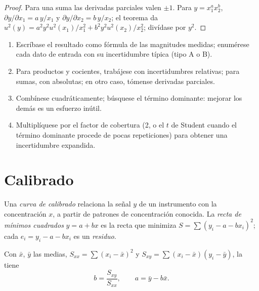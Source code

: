 \begin{proof}
Para una suma las derivadas parciales valen $\pm1$. Para $y = x_1^ax_2^b$, $\partial y/\partial x_1 =
a\,y/x_1$ y $\partial y/\partial x_2 = b\,y/x_2$; el teorema da $u^2(y) = a^2y^2u^2(x_1)/x_1^2 +
b^2y^2u^2(x_2)/x_2^2$; divídase por $y^2$.
\end{proof}

\begin{method}[Propagar]\label{met:b2:measurement-statistics:propagate}
\begin{enumerate}
  \item Escríbase el resultado como fórmula de las magnitudes medidas; enumérese cada dato de entrada con su incertidumbre
        típica (tipo A o B).
  \item Para productos y cocientes, trabájese con incertidumbres relativas; para sumas, con absolutas;
        en otro caso, tómense derivadas parciales.
  \item Combínese cuadráticamente; búsquese el término dominante: mejorar los demás es un esfuerzo inútil.
  \item Multiplíquese por el factor de cobertura (2, o el $t$ de Student cuando el término dominante procede de pocas
        repeticiones) para obtener una incertidumbre expandida.
\end{enumerate}
\end{method}

\section{Calibrado}

\begin{definition}\label{def:b2:measurement-statistics:calibration}
Una \emph{curva de calibrado} relaciona la señal $y$ de un instrumento con la
concentración $x$, a partir de patrones de concentración conocida. La \emph{recta de mínimos
cuadrados} $y = a + bx$ es la recta que minimiza $S = \sum (y_i - a -
bx_i)^2$; cada $e_i = y_i - a - bx_i$ es un \emph{residuo}.
\end{definition}

\begin{theorem}\label{thm:b2:measurement-statistics:least-squares}
Con $\bar x$, $\bar y$ las medias, $S_{xx} = \sum(x_i - \bar x)^2$ y $S_{xy} = \sum(x_i - \bar x)(y_i -
\bar y)$, la  tiene
\begin{equation*}
b = \frac{S_{xy}}{S_{xx}}, \qquad a = \bar y - b\bar x.
\end{equation*}
\end{theorem}

